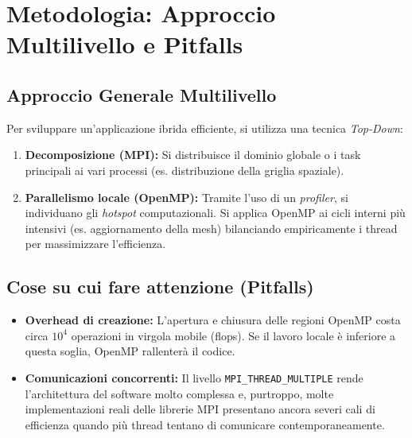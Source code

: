 \section{Metodologia: Approccio Multilivello e Pitfalls}

\subsection{Approccio Generale Multilivello}
Per sviluppare un'applicazione ibrida efficiente, si utilizza una tecnica \textit{Top-Down}:
\begin{enumerate}
    \item \textbf{Decomposizione (MPI):} Si distribuisce il dominio globale o i task principali ai vari processi (es. distribuzione della griglia spaziale).
    \item \textbf{Parallelismo locale (OpenMP):} Tramite l'uso di un \textit{profiler}, si individuano gli \textit{hotspot} computazionali. Si applica OpenMP ai cicli interni più intensivi (es. aggiornamento della mesh) bilanciando empiricamente i thread per massimizzare l'efficienza.
\end{enumerate}

\subsection{Cose su cui fare attenzione (Pitfalls)}
\begin{itemize}
    \item \textbf{Overhead di creazione:} L'apertura e chiusura delle regioni OpenMP costa circa $10^4$ operazioni in virgola mobile (flops). Se il lavoro locale è inferiore a questa soglia, OpenMP rallenterà il codice.
    \item \textbf{Comunicazioni concorrenti:} Il livello \texttt{MPI\_THREAD\_MULTIPLE} rende l'architettura del software molto complessa e, purtroppo, molte implementazioni reali delle librerie MPI presentano ancora severi cali di efficienza quando più thread tentano di comunicare contemporaneamente.
\end{itemize}